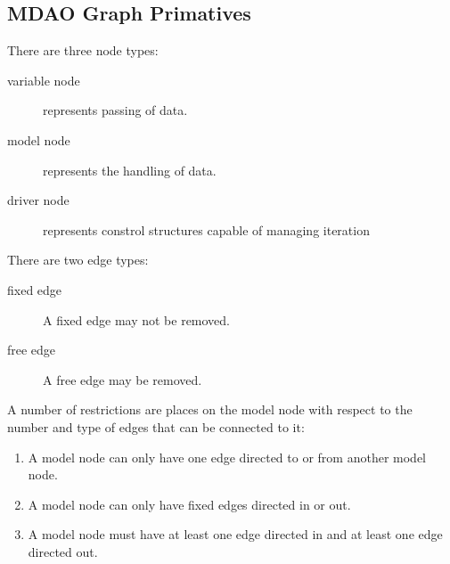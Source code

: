 \subsection{MDAO Graph Primatives}
There are three node types:  
\begin{description}
\item[variable node] represents passing of data.
\item[model node] represents the handling of data.
\item[driver node] represents constrol structures capable of managing iteration
\end{description}
There are two edge types: 
\begin{description}
\item[fixed edge] A fixed edge may not be removed.
\item[free edge] A free edge may be removed.
\end{description}

A number of restrictions are places on the model node with respect to the number and 
type of edges that can be connected to it: 
\begin{enumerate}
\item A model node can only have one edge directed to or from another model node.
\item A model node can only have fixed edges directed in or out.
\item A model node must have at least one edge directed in and at least one edge directed out.
\end{enumerate}

